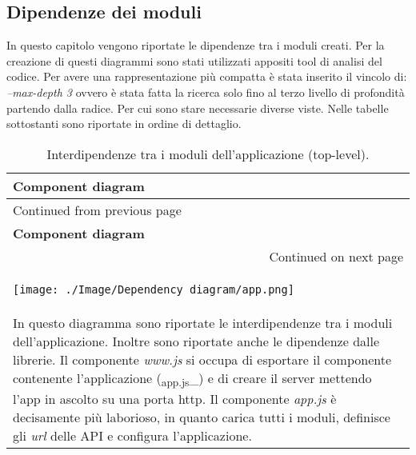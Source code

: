 \documentclass[onecolumn,a4paper]{article}
\begin{document}
\subsection{Dipendenze dei moduli}
\label{sec:orga54f099}
In questo capitolo vengono riportate le dipendenze tra i moduli creati. Per la creazione di questi diagrammi sono stati utilizzati appositi tool di analisi del codice. Per avere una rappresentazione più compatta è stata inserito il vincolo di: \emph{--max-depth 3} ovvero è stata fatta la ricerca solo fino al terzo livello di profondità partendo dalla radice. Per cui sono stare necessarie diverse viste. Nelle tabelle sottostanti sono riportate in ordine di dettaglio.

\begin{longtable}{|p{13cm}|}
\caption{Interdipendenze tra i moduli dell'applicazione (top-level).}
\\
\cellcolor{grey!15} \textbf{Component diagram}\\
\hline
\endfirsthead
\multicolumn{1}{l}{Continued from previous page} \\
\hline

\cellcolor{grey!15} \textbf{Component diagram} \\

\hline
\endhead
\hline\multicolumn{1}{r}{Continued on next page} \\
\endfoot
\endlastfoot
\hline
\begin{center}
\texttt{[image: ./Image/Dependency diagram/app.png]}
\end{center}\\
\hline
In questo diagramma sono riportate le interdipendenze tra i moduli dell'applicazione. Inoltre sono riportate anche le dipendenze dalle librerie. Il componente \emph{www.js}  si occupa di esportare il componente contenente l'applicazione (\textsubscript{app.js}\_) e di creare il server mettendo l'app in ascolto su una porta http. Il componente \emph{app.js} è decisamente più laborioso, in quanto carica tutti i moduli, definisce gli \emph{url} delle API e configura l'applicazione.\\
\hline
\end{longtable}
\end{document}
